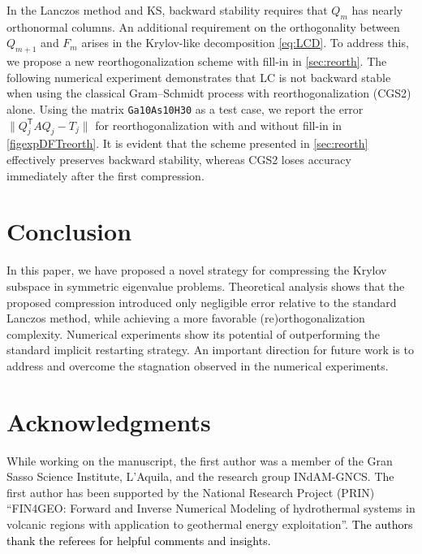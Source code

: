 \documentclass{siamart190516}
\newcommand{\Ttran}{\mathsf{T}}
\providecommand{\norm}[1]{\lVert#1\rVert}
\providecommand{\edit}[1]{\textcolor{black}{#1}}
\begin{document}
In the Lanczos method and KS, backward stability requires that $Q_{m}$ has nearly orthonormal columns.
An additional requirement on the orthogonality between $Q_{m+1}$ and $F_{m}$ arises in the Krylov-like decomposition \cref{eq:LCD}.  
To address this, we propose a new reorthogonalization scheme with fill-in in \cref{sec:reorth}.  
The following numerical experiment demonstrates that LC is not backward stable when using the classical Gram--Schmidt process with reorthogonalization (CGS2) alone.  
Using the matrix \texttt{Ga10As10H30} as a test case, we report the error $\norm{Q_{j}^{\Ttran}AQ_{j}-T_{j}}$ for reorthogonalization with and without fill-in in \cref{figexpDFTreorth}. It is evident that the scheme presented in \cref{sec:reorth} effectively preserves backward stability, whereas CGS2 loses accuracy immediately after the first compression.






\section{Conclusion}

In this paper, we have proposed a novel strategy for compressing the Krylov subspace in symmetric eigenvalue problems. Theoretical analysis shows that the proposed compression introduced only negligible error relative to the standard Lanczos method, while achieving a more favorable (re)orthogonalization complexity. Numerical experiments show its potential of outperforming the standard implicit restarting strategy. An important direction for future work is to address and overcome the stagnation observed in the numerical experiments.


\section*{Acknowledgments}

While working on the manuscript, the first author was a member of the Gran Sasso Science Institute, L'Aquila, and 
the research group INdAM-GNCS. The first author has been supported by 
the National Research Project (PRIN) ``FIN4GEO: Forward and Inverse Numerical Modeling of hydrothermal systems in volcanic regions with application to geothermal energy exploitation''.
\edit{The authors thank the referees for helpful comments and insights.}
\end{document}
